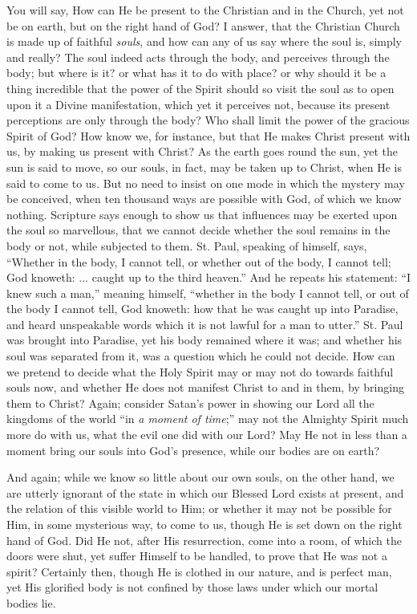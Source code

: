 You will say, How can He be present to the Christian and in the
Church, yet not be on earth, but on the right hand of God? I answer,
that the Christian Church is made up of faithful \emph{souls}, and how
can any of us say where the soul is, simply and really? The soul indeed
acts through the body, and perceives through the body; but where is it?
or what has it to do with place? or why should it be a thing incredible
that the power of the Spirit should so visit the soul as to open upon it
a Divine manifestation, which yet it perceives not, because its present
perceptions are only through the body? Who shall limit the power of the
gracious Spirit of God? How know we, for instance, but that He makes
Christ present with us, by making us present with Christ? As the earth
goes round the sun, yet the sun is said to move, so our souls, in fact,
may be taken up to Christ, when He is said to come to us. But no need to
insist on one mode in which the mystery may be conceived, when ten
thousand ways are possible with God, of which we know nothing. Scripture
says enough to show us that influences may be exerted upon the soul so
marvellous, that we cannot decide whether the soul remains in the body
or not, while subjected to them. St. Paul, speaking of himself, says,
``Whether in the body, I cannot tell, or whether out of the body, I
cannot tell; God knoweth: ... caught up to the third heaven.'' And
he repeats his statement: ``I knew such a man,'' meaning
himself, ``whether in the body I cannot tell, or out of the body I
cannot tell, God knoweth: how that he was caught up into Paradise, and
heard unspeakable words which it is not lawful for a man to utter.''
St. Paul was brought into Paradise, yet his body remained where it was;
and whether his soul was separated from it, was a question which he
could not decide. How can we pretend to decide what the Holy Spirit may
or may not do towards faithful souls now, and whether He does not
manifest Christ to and in them, by bringing them to Christ? Again;
consider Satan's power in showing our Lord all the kingdoms of the world
``in \emph{a moment of time};'' may not the Almighty Spirit much
more do with us, what the evil one did with our Lord? May He not in less
than a moment bring our souls into God's presence, while our bodies are
on earth?

And again; while we know so little about our own souls, on the other
hand, we are utterly ignorant of the state in which our Blessed Lord
exists at present, and the relation of this visible world to Him; or
whether it may not be possible for Him, in some mysterious way, to come
to us, though He is set down on the right hand of God. Did He not, after
His resurrection, come into a room, of which the doors were shut, yet
suffer Himself to be handled, to prove that He was not a spirit?
Certainly then, though He is clothed in our nature, and is perfect man,
yet His glorified body is not confined by those laws under which our
mortal bodies lie.

